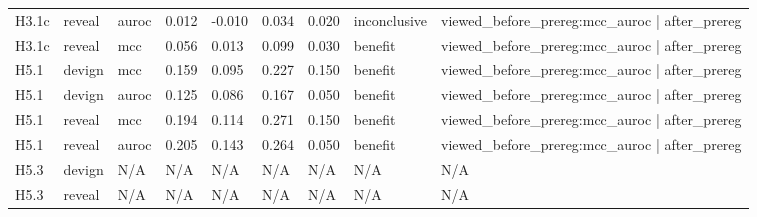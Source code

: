 \begin{tabular}{lllllllll}
H3.1c & reveal & auroc & 0.012 & -0.010 & 0.034 & 0.020 & inconclusive & viewed\_before\_prereg:mcc\_auroc | after\_prereg \\
H3.1c & reveal & mcc & 0.056 & 0.013 & 0.099 & 0.030 & benefit & viewed\_before\_prereg:mcc\_auroc | after\_prereg \\
H5.1 & devign & mcc & 0.159 & 0.095 & 0.227 & 0.150 & benefit & viewed\_before\_prereg:mcc\_auroc | after\_prereg \\
H5.1 & devign & auroc & 0.125 & 0.086 & 0.167 & 0.050 & benefit & viewed\_before\_prereg:mcc\_auroc | after\_prereg \\
H5.1 & reveal & mcc & 0.194 & 0.114 & 0.271 & 0.150 & benefit & viewed\_before\_prereg:mcc\_auroc | after\_prereg \\
H5.1 & reveal & auroc & 0.205 & 0.143 & 0.264 & 0.050 & benefit & viewed\_before\_prereg:mcc\_auroc | after\_prereg \\
H5.3 & devign & N/A & N/A & N/A & N/A & N/A & N/A & N/A \\
H5.3 & reveal & N/A & N/A & N/A & N/A & N/A & N/A & N/A \\
\bottomrule
\end{tabular}